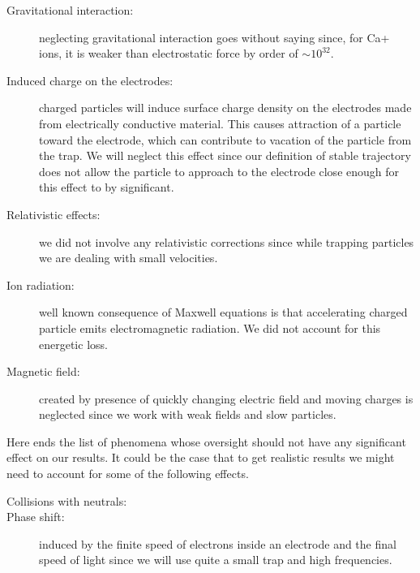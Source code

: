 \begin{description}
	\item[Gravitational interaction:] neglecting gravitational interaction goes without saying since, for Ca+ ions, it is weaker than electrostatic force by order of $\sim 10^{32}$.
	\item[Induced charge on the electrodes:] charged particles will induce surface charge density on the electrodes made from electrically conductive material. This causes attraction of a particle toward the electrode, which can contribute to vacation of the particle from the trap. We will neglect this effect since our definition of stable trajectory does not allow the particle to approach to the electrode close enough for this effect to by significant.
	\item[Relativistic effects:] we did not involve any relativistic corrections since while trapping particles we are dealing with small velocities.
	\item[Ion radiation:] well known consequence of Maxwell equations is that accelerating charged particle emits electromagnetic radiation. We did not account for this energetic loss.
	\item[Magnetic field:] created by presence of quickly changing electric field and moving charges is neglected since we work with weak fields and slow particles. 
\end{description}	
Here ends the list of phenomena whose oversight should not have any significant effect on our results. It could be the case that to get realistic results we might need to account for some of the following effects.
\begin{description}
	\item[Collisions with neutrals:]  
	\item[Phase shift:] induced by the finite speed of electrons inside an electrode and the final speed of light since we will use quite a small trap and high frequencies.  
\end{description}

